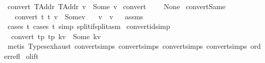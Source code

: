 \begin{isabellebody}
{\isacharbar}{\kern0pt}\ {\isachardoublequoteopen}convert\ TAddr\ TAddr\ v\ {\isacharequal}{\kern0pt}\ Some\ v{\isachardoublequoteclose}\isanewline
{\isacharbar}{\kern0pt}\ {\isachardoublequoteopen}convert\ {\isacharunderscore}{\kern0pt}\ {\isacharunderscore}{\kern0pt}\ {\isacharunderscore}{\kern0pt}\ {\isacharequal}{\kern0pt}\ None{\isachardoublequoteclose}\isanewline
\isanewline
\isanewline
\isanewline
{}\isamarkupfalse%
\ convertSame{\isacharcolon}{\kern0pt}\isanewline
\ \ \ {\isachardoublequoteopen}convert\ t{}\ t{}\ v\ {\isacharequal}{\kern0pt}\ Some{\isacharparenleft}{\kern0pt}v{\isacharprime}{\kern0pt}{\isacharparenright}{\kern0pt}{\isachardoublequoteclose}\isanewline
\ \ \ {\isachardoublequoteopen}v\ {\isacharequal}{\kern0pt}\ v{\isacharprime}{\kern0pt}{\isachardoublequoteclose}%
\isadelimproof
\ %
\endisadelimproof
%
\isatagproof
{}\isamarkupfalse%
\ assms\ \isamarkupfalse%
\ {\isacharparenleft}{\kern0pt}cases\ t{}{\isacharsemicolon}{\kern0pt}\ cases\ t{}{\isacharsemicolon}{\kern0pt}\ {\isacharparenleft}{\kern0pt}simp\ split{\isacharcolon}{\kern0pt}if{\isacharunderscore}{\kern0pt}split{\isacharunderscore}{\kern0pt}asm{\isacharparenright}{\kern0pt}{\isacharparenright}{\kern0pt}%
\endisatagproof
{\isafoldproof}%
%
\isadelimproof
%
\endisadelimproof
\isanewline
\isanewline
\isanewline
{}\isamarkupfalse%
\ convert{\isacharunderscore}{\kern0pt}id{\isacharbrackleft}{\kern0pt}simp{\isacharbrackright}{\kern0pt}{\isacharcolon}{\kern0pt}\isanewline
\ \ {\isachardoublequoteopen}convert\ tp\ tp\ kv\ {\isacharequal}{\kern0pt}\ Some\ kv{\isachardoublequoteclose}\isanewline
%
\isadelimproof
\ \ \ \ %
\endisadelimproof
%
\isatagproof
{}\isamarkupfalse%
\ {\isacharparenleft}{\kern0pt}metis\ Types{\isachardot}{\kern0pt}exhaust\ convert{\isachardot}{\kern0pt}simps{\isacharparenleft}{\kern0pt}{}{\isacharparenright}{\kern0pt}\ convert{\isachardot}{\kern0pt}simps{\isacharparenleft}{\kern0pt}{}{\isacharparenright}{\kern0pt}\ convert{\isachardot}{\kern0pt}simps{\isacharparenleft}{\kern0pt}{}{\isacharparenright}{\kern0pt}\ convert{\isachardot}{\kern0pt}simps{\isacharparenleft}{\kern0pt}{}{\isacharparenright}{\kern0pt}\ order{\isacharunderscore}{\kern0pt}refl{\isacharparenright}{\kern0pt}%
\endisatagproof
{\isafoldproof}%
%
\isadelimproof
\isanewline
%
\endisadelimproof
\isanewline
\isanewline
{}\isamarkupfalse%
\ olift\ {\isacharcolon}{\kern0pt}{\isacharcolon}{\kern0pt}\isanewline

\end{isabellebody}
